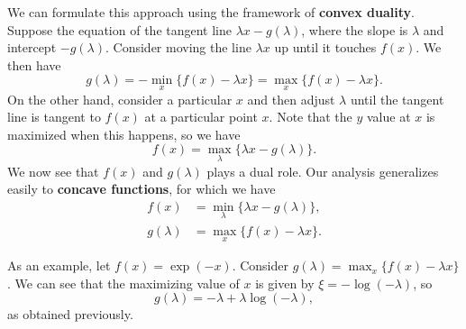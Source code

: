 \documentclass[a4paper]{article}
\begin{document}
We can formulate this approach using the framework 
of \textbf{convex duality}. Suppose the equation 
of the tangent line $\lambda x - g(\lambda)$, where 
the slope is $\lambda$ and intercept $- g(\lambda)$.
Consider moving the line $\lambda x$ up until it touches 
$f(x)$. We then have
\[
g(\lambda) = - \min_x \{f(x) - \lambda x\} 
= \max_x \{f(x) - \lambda x\}.
\]
On the other hand, consider a particular $x$ and 
then adjust $\lambda$ until the tangent line is
tangent to $f(x)$ at a particular point $x$. 
Note that the $y$ value at $x$ is maximized when 
this happens, so we have 
\[
f(x) = \max_\lambda \{\lambda x - g(\lambda)\}.
\]
We now see that $f(x)$ and $g(\lambda)$ plays a dual role.
Our analysis generalizes easily to \textbf{concave functions},
for which we have 
\[
\begin{aligned}
f(x) &= \min_\lambda \{\lambda x - g(\lambda)\}, \\
g(\lambda) &= \max_x \{f(x) - \lambda x\}.
\end{aligned}
\]

\begin{eg}
As an example, let $f(x) = \exp (-x)$.
Consider $g(\lambda) = \max_x \{f(x) - \lambda x\}$. 
We can see that the maximizing 
value of $x$ is given by $\xi = - \log(- \lambda)$, so 
\[
g(\lambda) = -\lambda + \lambda \log (- \lambda),
\]
as obtained previously.
\end{eg}
\end{document}
